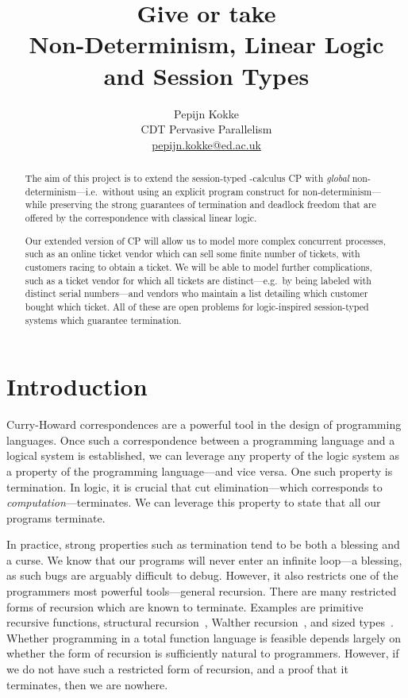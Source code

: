 \documentclass[twocolumn]{article}
\title{Give or take \\
  {\large Non-Determinism, Linear Logic and Session Types}}
\author{Pepijn Kokke \\
  CDT Pervasive Parallelism \\
  \url{pepijn.kokke@ed.ac.uk}}
\begin{document}
\maketitle

\begin{abstract}
  The aim of this project is to extend the session-typed \textpi-calculus CP
  \citep{wadler2012} with \emph{global} non-determinism---i.e.\ without using an
  explicit program construct for non-determinism---while preserving the strong
  guarantees of termination and deadlock freedom that are offered by the
  correspondence with classical linear logic. 
  
  Our extended version of CP will allow us to model more complex concurrent
  processes, such as an online ticket vendor which can sell some finite number
  of tickets, with customers racing to obtain a ticket.
  We will be able to model further complications, such as a ticket vendor for
  which all tickets are distinct---e.g.\ by being labeled with distinct serial
  numbers---and vendors who maintain a list detailing which customer bought
  which ticket.
  All of these are open problems for logic-inspired session-typed systems which
  guarantee termination.
\end{abstract}

\section{Introduction}
Curry-Howard correspondences are a powerful tool in the design of programming
languages. Once such a correspondence between a programming language and a
logical system is established, we can leverage any property of the logic system
as a property of the programming language---and vice versa. One such property is
termination. In logic, it is crucial that cut elimination---which corresponds to
\emph{computation}---terminates. We can leverage this property to state that all
our programs terminate.

In practice, strong properties such as termination tend to be both a blessing
and a curse. We know that our programs will never enter an infinite loop---a
blessing, as such bugs are arguably difficult to debug. However, it also
restricts one of the programmers most powerful tools---general recursion.
There are many restricted forms of recursion which are known to
terminate. Examples are primitive recursive functions, structural
recursion~\citep{burstall1969}, Walther recursion~\citep{walther1994}, and sized
types~\citep{lee2001}. Whether programming in a total function language is
feasible depends largely on whether the form of recursion is sufficiently
natural to programmers.
However, if we do not have such a restricted form of recursion, and a proof that
it terminates, then we are nowhere.
\end{document}
